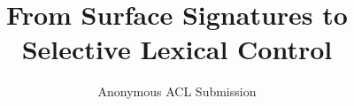 \documentclass[11pt]{article}
\title{From Surface Signatures to Selective Lexical Control}
\author{Anonymous ACL Submission}
\begin{document}
\maketitle



\clearpage
\begingroup
\sloppy
\raggedbottom

\endgroup

\clearpage
\appendix


\FloatBarrier
\end{document}
